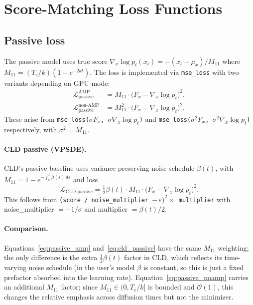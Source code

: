 \documentclass[11pt]{article}
\begin{document}
\section{Score-Matching Loss Functions}

\subsection{Passive loss}

The passive model uses true score $\nabla_x \log p_t(x_t) = -(x_t - \mu_x)/M_{11}$
where $M_{11} = (T_e/k)(1 - e^{-2kt})$.
The loss is implemented via \texttt{mse\_loss} with two variants depending on GPU mode:
\begin{align}
\mathcal{L}_{\text{passive}}^{\text{AMP}} &= M_{11} \cdot \bigl(F_x - \nabla_x \log p_t\bigr)^2,
\label{eq:passive_amp}\\
\mathcal{L}_{\text{passive}}^{\text{non-AMP}} &= M_{11}^2 \cdot \bigl(F_x - \nabla_x \log p_t\bigr)^2.
\label{eq:passive_noamp}
\end{align}
These arise from \texttt{mse\_loss($\sigma F_x$,\; $\sigma \nabla_x \log p_t$)}
and \texttt{mse\_loss($\sigma^2 F_x$,\; $\sigma^2 \nabla_x \log p_t$)} respectively,
with $\sigma^2 = M_{11}$.

\paragraph{CLD passive (VPSDE).}
CLD's passive baseline uses variance-preserving noise schedule $\beta(t)$,
with $M_{11} = 1 - e^{-\int_0^t \beta(s)\,ds}$ and loss
\begin{equation}
\mathcal{L}_{\text{CLD-passive}} = \tfrac{1}{2}\beta(t) \cdot M_{11}
\cdot \bigl(F_x - \nabla_x \log p_t\bigr)^2.
\label{eq:cld_passive}
\end{equation}
This follows from \texttt{(score / noise\_multiplier $-\,\varepsilon)^2 \times$ multiplier}
with noise\_multiplier $= -1/\sigma$ and multiplier $= \beta(t)/2$.

\paragraph{Comparison.}
Equations~\eqref{eq:passive_amp} and~\eqref{eq:cld_passive} have the same $M_{11}$
weighting; the only difference is the extra $\tfrac{1}{2}\beta(t)$ factor in CLD, which
reflects its time-varying noise schedule (in the user's model $\beta$ is constant, so
this is just a fixed prefactor absorbed into the learning rate).
Equation~\eqref{eq:passive_noamp} carries an additional $M_{11}$ factor; since
$M_{11} \in (0, T_e/k]$ is bounded and $\mathcal{O}(1)$, this changes the relative
emphasis across diffusion times but not the minimizer.
\end{document}
